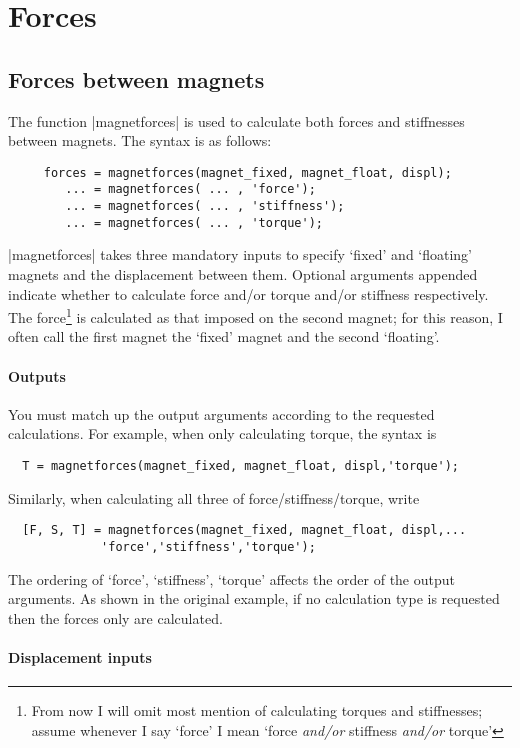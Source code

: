 \documentclass{article}
\begin{document}
\section{Forces}

\subsection{Forces between magnets}

The function |magnetforces| is used to calculate both forces and stiffnesses
between magnets. The syntax is as follows:

\begin{verbatim}
     forces = magnetforces(magnet_fixed, magnet_float, displ);
        ... = magnetforces( ... , 'force');
        ... = magnetforces( ... , 'stiffness');
        ... = magnetforces( ... , 'torque');
\end{verbatim}

|magnetforces| takes three mandatory inputs to specify `fixed' and `floating' magnets and the displacement between them.
Optional arguments appended indicate whether to calculate force and/or torque and/or stiffness respectively.
The force\footnote{From now I will omit most mention of calculating torques and stiffnesses; assume whenever I say `force' I mean `force \emph{and/or} stiffness \emph{and/or} torque'} is calculated as that imposed on the second magnet; for this reason, I often call the first magnet the `fixed' magnet and the second `floating'.

\paragraph{Outputs}
You must match up the output arguments according to the requested calculations.
For example, when only calculating torque, the syntax is
\begin{verbatim}
  T = magnetforces(magnet_fixed, magnet_float, displ,'torque');
\end{verbatim}
Similarly, when calculating all three of force/stiffness/torque, write
\begin{verbatim}
  [F, S, T] = magnetforces(magnet_fixed, magnet_float, displ,...
	         'force','stiffness','torque');
\end{verbatim}
The ordering of `force', `stiffness', `torque' affects the order of the output
arguments.
As shown in the original example, if no calculation type is requested then
the forces only are calculated.

\paragraph{Displacement inputs}
\end{document}
